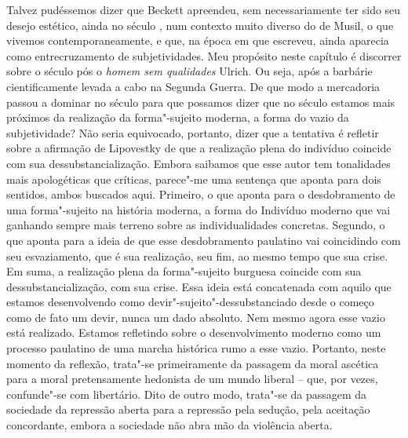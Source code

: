 Talvez pudéssemos dizer que Beckett apreendeu, sem necessariamente ter
sido seu desejo estético, ainda no século , num contexto muito diverso
do de Musil, o que vivemos contemporaneamente, e que, na época em que
escreveu, ainda aparecia como entrecruzamento de subjetividades. Meu
propósito neste capítulo é discorrer sobre o século  pós o \emph{homem
sem qualidades} Ulrich. Ou seja, após a barbárie cientificamente levada a
cabo na Segunda Guerra. De que modo a mercadoria passou a dominar no
século  para que possamos dizer que no século  estamos mais
próximos da realização da forma"-sujeito moderna, a forma do vazio da
subjetividade? Não seria equivocado, portanto, dizer que a tentativa é refletir sobre a
afirmação de Lipovestky de que a realização plena do indivíduo coincide
com sua dessubstancialização. Embora saibamos que esse autor tem
tonalidades mais apologéticas que críticas, parece"-me uma sentença que
aponta para dois sentidos, ambos buscados aqui. Primeiro, o que aponta para o
desdobramento de uma forma"-sujeito na história moderna, a forma do
Indivíduo moderno que vai ganhando sempre mais terreno sobre as
individualidades concretas. Segundo, o que aponta para a ideia de que esse desdobramento
paulatino vai coincidindo com seu esvaziamento, que é sua realização, seu fim, ao
mesmo tempo que sua crise. Em suma, a realização plena da forma"-sujeito
burguesa coincide com sua dessubstancialização, com sua crise. Essa
ideia está concatenada com aquilo que estamos desenvolvendo como
devir"-sujeito"-dessubstanciado desde o começo como de fato um devir,
nunca um dado absoluto. Nem mesmo agora esse vazio está realizado.
Estamos refletindo sobre o desenvolvimento moderno como um processo
paulatino de uma marcha histórica rumo a esse vazio. Portanto, neste momento
da reflexão, trata"-se primeiramente da passagem da moral ascética
para a moral pretensamente hedonista de um mundo liberal -- que, por
vezes, confunde"-se com libertário. Dito de outro modo, trata"-se da
passagem da sociedade da repressão aberta para a repressão pela sedução,
pela aceitação concordante, embora a sociedade não abra mão da violência
aberta.

